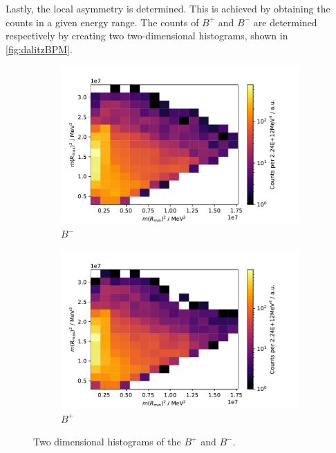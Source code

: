 Lastly, the local asymmetry is determined. This is achieved by obtaining 
the counts in a given energy range. The counts of $B^+$ and $B^-$ are 
determined respectively by creating two two-dimensional histograms, shown in \autoref{fig:dalitzBPM}.

\begin{figure}[H]
	\centering
	\begin{subfigure}{0.45\textwidth}
		\includegraphics[width=\textwidth]{content/pictures/image_fin/DalitzDataBNhist}
		\caption{$B^-$}
	\end{subfigure}
	\begin{subfigure}{0.45\textwidth}
		\includegraphics[width=\textwidth]{content/pictures/image_fin/DalitzDataBPhist}
		\caption{$B^+$}
	\end{subfigure} 
	\caption{Two dimensional histograms of the $B^+$ and $B^-$.} 
	\label{fig:dalitzBPM}
\end{figure}

